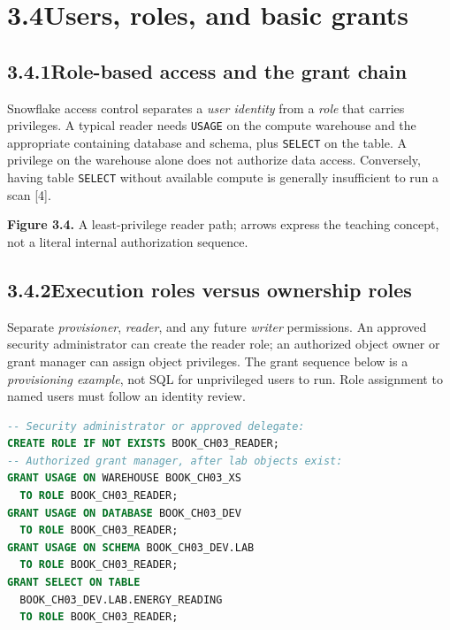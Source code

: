 \documentclass[11pt,twoside]{article}
\newcommand{\topic}[2]{\subsection*{#1\quad #2}}
\begin{document}
\newpage
\section*{3.4\quad Users, roles, and basic grants}
\topic{3.4.1}{Role-based access and the grant chain}
Snowflake access control separates a \emph{user identity} from a \emph{role} that carries privileges. A typical reader needs \texttt{USAGE} on the compute warehouse and the appropriate containing database and schema, plus \texttt{SELECT} on the table. A privilege on the warehouse alone does not authorize data access. Conversely, having table \texttt{SELECT} without available compute is generally insufficient to run a scan [4].

\begin{center}
\end{center}
{\small\color{inkgray}\textbf{Figure 3.4.} A least-privilege reader path; arrows express the teaching concept, not a literal internal authorization sequence.}\par
\topic{3.4.2}{Execution roles versus ownership roles}
Separate \emph{provisioner}, \emph{reader}, and any future \emph{writer} permissions. An approved security administrator can create the reader role; an authorized object owner or grant manager can assign object privileges. The grant sequence below is a \emph{provisioning example}, not SQL for unprivileged users to run. Role assignment to named users must follow an identity review.
\begin{lstlisting}[language=SQL,caption={Administrator-authorized role and object grants.}]
-- Security administrator or approved delegate:
CREATE ROLE IF NOT EXISTS BOOK_CH03_READER;
-- Authorized grant manager, after lab objects exist:
GRANT USAGE ON WAREHOUSE BOOK_CH03_XS
  TO ROLE BOOK_CH03_READER;
GRANT USAGE ON DATABASE BOOK_CH03_DEV
  TO ROLE BOOK_CH03_READER;
GRANT USAGE ON SCHEMA BOOK_CH03_DEV.LAB
  TO ROLE BOOK_CH03_READER;
GRANT SELECT ON TABLE
  BOOK_CH03_DEV.LAB.ENERGY_READING
  TO ROLE BOOK_CH03_READER;
\end{lstlisting}
\end{document}
